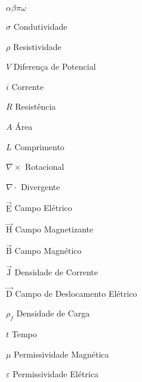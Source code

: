 \documentclass[csgeo,tcc]{unipampa}
\newcommand{\ven}[1]{\vec{\textrm{#1}}}                                         %
\begin{document}
\begin{listofsymbols}{$\alpha\beta\pi\omega$}
       \item[$\sigma$]                  Condutividade
       \item[$\rho$]                    Resistividade
       \item[$V$]                       Diferença de Potencial
       \item[$i$]                       Corrente
       \item[$R$]                       Resistência
       \item[$A$]                       Área
       \item[$L$]                       Comprimento
       \item[$\nabla \times$]           Rotacional
       \item[$\nabla \cdot$]            Divergente
       \item[$\ven{E}$]                 Campo Elétrico
       \item[$\ven{H}$]                 Campo Magnetizante
       \item[$\ven{B}$]                 Campo Magnético
       \item[$\ven{J}$]                 Densidade de Corrente
       \item[$\ven{D}$]                 Campo de Deslocamento Elétrico
       \item[$\rho_f$]                  Densidade de Carga
       \item[$t$]                       Tempo
       \item[$\mu$]                     Permissividade Magnética
       \item[$\varepsilon$]             Permissividade Elétrica
       
       
\end{listofsymbols}







\tableofcontents
\end{document}

